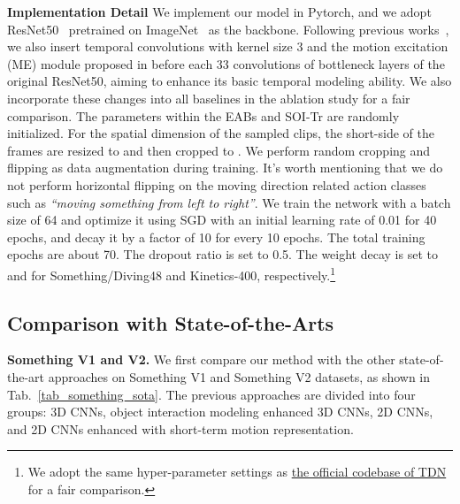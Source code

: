 \noindent \textbf{Implementation Detail}
We implement our model in Pytorch, and we adopt ResNet50~\cite{he2016deep} pretrained on ImageNet~\cite{deng2009imagenet} as the backbone.
Following previous works~\cite{kwon2020motionsqueeze}\cite{li2020tea}, we also insert temporal convolutions with kernel size 3 and the motion excitation (ME) module proposed in \cite{li2020tea} before each 33 convolutions of bottleneck layers of the original ResNet50, aiming to enhance its basic temporal modeling ability. We also incorporate these changes into all baselines in the ablation study for a fair comparison. 
The parameters within the EABs and SOI-Tr are randomly initialized.
For the spatial dimension of the sampled clips, the short-side of the frames are resized to  and then cropped to . We perform random cropping and flipping as data augmentation during training.
It's worth mentioning that we do not perform horizontal flipping on the moving direction related action classes such as \textit{``moving something from left to right''}.
We train the network with a batch size of 64 and optimize it using SGD with an initial learning rate of 0.01 for 40 epochs, and decay it by a factor of 10 for every 10 epochs. The total training epochs are about 70.
The dropout ratio is set to 0.5. The weight decay is set to  and  for Something/Diving48 and Kinetics-400, respectively.\footnote{We adopt the same hyper-parameter settings as \href{https://github.com/MCG-NJU/TDN}{the official codebase of TDN}
for a fair comparison.}






\spaceabovesubsection
\subsection{Comparison with State-of-the-Arts}



 \textbf{Something V1 and V2.}
We first compare our method with the other state-of-the-art approaches on Something V1 and Something V2 datasets, as shown in Tab.~\ref{tab_something_sota}.
The previous approaches are divided into four groups: 3D CNNs, object interaction modeling enhanced 3D CNNs, 2D CNNs, and 2D CNNs enhanced with short-term motion representation.


